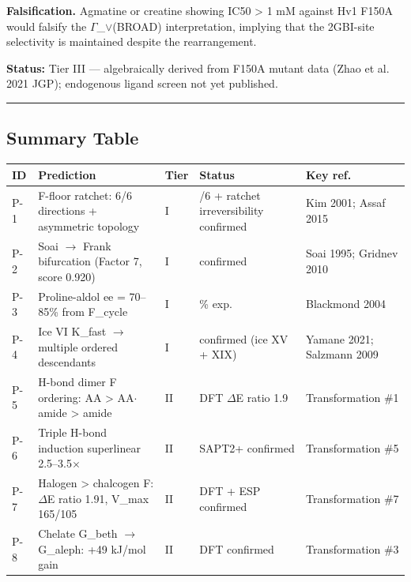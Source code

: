 \documentclass[12pt,a4paper]{article}
\begin{document}
\textbf{Falsification.} Agmatine or creatine showing IC50 \textgreater{} 1 mM against Hv1 F150A would falsify the $\Gamma$\_$\lor$(BROAD) interpretation, implying that the 2GBI-site selectivity is maintained despite the rearrangement.

\textbf{Status:} Tier III --- algebraically derived from F150A mutant data (Zhao et al. 2021 JGP); endogenous ligand screen not yet published.

\begin{center}
\rule{0.5\textwidth}{0.4pt}
\end{center}

\subsection{Summary Table}

\begin{table}[htbp]
\centering
\small
{}
\begin{tabularx}{\textwidth}{>{\centering\arraybackslash}X >{\centering\arraybackslash}X >{\centering\arraybackslash}X >{\centering\arraybackslash}X >{\centering\arraybackslash}X}
\toprule
\rowcolor{gray!25}\textbf{ID} & \textbf{Prediction} & \textbf{Tier} & \textbf{Status} & \textbf{Key ref.} \\
\midrule
\rowcolors{1}{white}{gray!10}
P-1 & F-floor ratchet: 6/6 directions + asymmetric topology & I &  6/6 + ratchet irreversibility confirmed & Kim 2001; Assaf 2015 \\
P-2 & Soai $\rightarrow$ Frank bifurcation (Factor 7, score 0.920) & I &  confirmed & Soai 1995; Gridnev 2010 \\
P-3 & Proline-aldol ee = 70--85\% from F\_cycle & I &  74\% exp. & Blackmond 2004 \\
P-4 & Ice VI K\_fast $\rightarrow$ multiple ordered descendants & I &  confirmed (ice XV + XIX) & Yamane 2021; Salzmann 2009 \\
P-5 & H-bond dimer F ordering: AA \textgreater{} AA$\cdot$amide \textgreater{} amide & II &  DFT $\Delta$E ratio 1.9 & Transformation \#1 \\
P-6 & Triple H-bond induction superlinear 2.5--3.5$\times$ & II &  SAPT2+ confirmed & Transformation \#5 \\
P-7 & Halogen \textgreater{} chalcogen F: $\Delta$E ratio 1.91, V\_max 165/105 & II &  DFT + ESP confirmed & Transformation \#7 \\
P-8 & Chelate G\_beth $\rightarrow$ G\_aleph: +49 kJ/mol gain & II &  DFT confirmed & Transformation \#3 \\

\end{tabularx}
\end{table}
\end{document}
